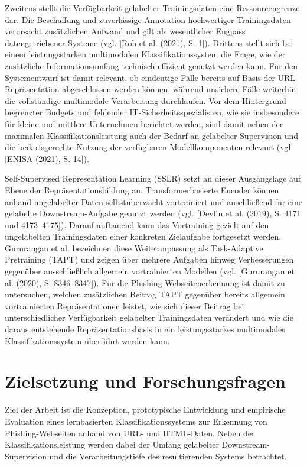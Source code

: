 Zweitens stellt die Verfügbarkeit gelabelter Trainingsdaten eine Ressourcengrenze dar. Die
Beschaffung und zuverlässige Annotation hochwertiger Trainingsdaten verursacht zusätzlichen
Aufwand und gilt als wesentlicher Engpass datengetriebener Systeme
(vgl. [Roh et al. (2021), S. 1]). Drittens stellt sich bei einem leistungsstarken multimodalen
Klassifikationssystem die Frage, wie der zusätzliche Informationsumfang technisch effizient
genutzt werden kann. Für den Systementwurf ist damit relevant, ob eindeutige Fälle bereits auf
Basis der URL-Repräsentation abgeschlossen werden können, während unsichere Fälle weiterhin
die vollständige multimodale Verarbeitung durchlaufen. Vor dem Hintergrund begrenzter Budgets
und fehlender IT-Sicherheitsspezialisten, wie sie insbesondere für kleine und mittlere Unternehmen
berichtet werden, sind damit neben der maximalen Klassifikationsleistung auch der Bedarf an
gelabelter Supervision und die bedarfsgerechte Nutzung der verfügbaren Modellkomponenten
relevant (vgl. [ENISA (2021), S. 14]).

Self-Supervised Representation Learning (SSLR) setzt an dieser Ausgangslage auf Ebene der
Repräsentationsbildung an. Transformerbasierte Encoder können anhand ungelabelter Daten
selbstüberwacht vortrainiert und anschließend für eine gelabelte Downstream-Aufgabe genutzt
werden (vgl. [Devlin et al. (2019), S. 4171 und 4173--4175]). Darauf aufbauend kann das
Vortraining gezielt auf den ungelabelten Trainingsdaten einer konkreten Zielaufgabe fortgesetzt
werden. Gururangan et al. bezeichnen diese Weiteranpassung als Task-Adaptive Pretraining
(TAPT) und zeigen über mehrere Aufgaben hinweg Verbesserungen gegenüber ausschließlich
allgemein vortrainierten Modellen (vgl. [Gururangan et al. (2020), S. 8346--8347]). Für die Phishing-Webseitenerkennung ist damit zu untersuchen, welchen zusätzlichen Beitrag
TAPT gegenüber bereits allgemein vortrainierten Repräsentationen leistet, wie sich dieser Beitrag
bei unterschiedlicher Verfügbarkeit gelabelter Trainingsdaten verändert und wie die daraus
entstehende Repräsentationsbasis in ein leistungsstarkes multimodales Klassifikationssystem
überführt werden kann.

\section{Zielsetzung und Forschungsfragen}

Ziel der Arbeit ist die Konzeption, prototypische Entwicklung und empirische Evaluation eines
lernbasierten Klassifikationssystems zur Erkennung von Phishing-Webseiten anhand von URL-
und HTML-Daten. Neben der Klassifikationsleistung werden dabei der Umfang gelabelter
Downstream-Supervision und die Verarbeitungstiefe des resultierenden Systems betrachtet.

